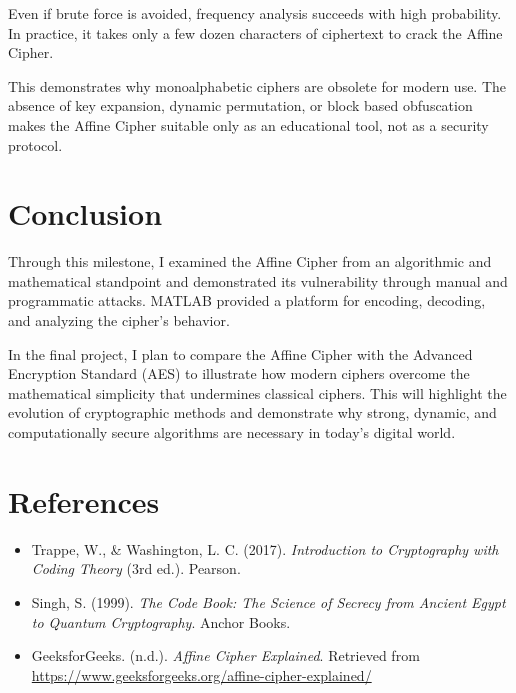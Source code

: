 \documentclass[12pt]{article}
\begin{document}
Even if brute force is avoided, frequency analysis succeeds with high probability. In practice, it takes only a few dozen characters of ciphertext to crack the Affine Cipher.

This demonstrates why monoalphabetic ciphers are obsolete for modern use. The absence of key expansion, dynamic permutation, or block based obfuscation makes the Affine Cipher suitable only as an educational tool, not as a security protocol.

\section*{Conclusion}
Through this milestone, I examined the Affine Cipher from an algorithmic and mathematical standpoint and demonstrated its vulnerability through manual and programmatic attacks. MATLAB provided a platform for encoding, decoding, and analyzing the cipher's behavior.

In the final project, I plan to compare the Affine Cipher with the Advanced Encryption Standard (AES) to illustrate how modern ciphers overcome the mathematical simplicity that undermines classical ciphers. This will highlight the evolution of cryptographic methods and demonstrate why strong, dynamic, and computationally secure algorithms are necessary in today's digital world.

\section*{References}
\begin{itemize}
    \item Trappe, W., \& Washington, L. C. (2017). \textit{Introduction to Cryptography with Coding Theory} (3rd ed.). Pearson.
    \item Singh, S. (1999). \textit{The Code Book: The Science of Secrecy from Ancient Egypt to Quantum Cryptography}. Anchor Books.
    \item GeeksforGeeks. (n.d.). \textit{Affine Cipher Explained}. Retrieved from \url{https://www.geeksforgeeks.org/affine-cipher-explained/}
\end{itemize}
\end{document}
